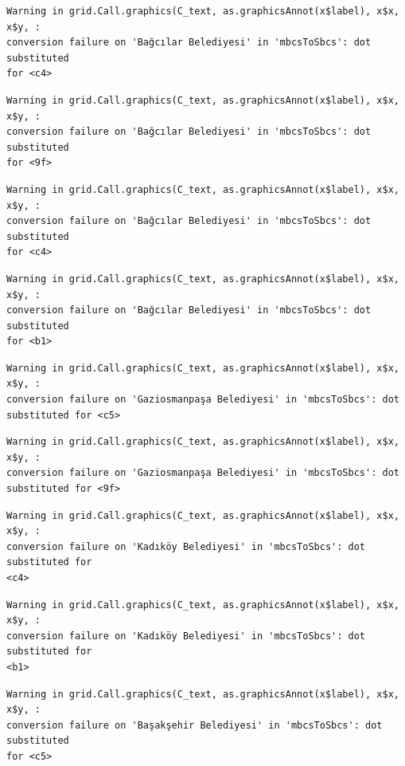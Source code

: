 \documentclass[
  11pt,
  a4paper,
  DIV=11,
  numbers=noendperiod]{scrartcl}
\begin{document}
\begin{verbatim}
Warning in grid.Call.graphics(C_text, as.graphicsAnnot(x$label), x$x, x$y, :
conversion failure on 'Bağcılar Belediyesi' in 'mbcsToSbcs': dot substituted
for <c4>
\end{verbatim}

\begin{verbatim}
Warning in grid.Call.graphics(C_text, as.graphicsAnnot(x$label), x$x, x$y, :
conversion failure on 'Bağcılar Belediyesi' in 'mbcsToSbcs': dot substituted
for <9f>
\end{verbatim}

\begin{verbatim}
Warning in grid.Call.graphics(C_text, as.graphicsAnnot(x$label), x$x, x$y, :
conversion failure on 'Bağcılar Belediyesi' in 'mbcsToSbcs': dot substituted
for <c4>
\end{verbatim}

\begin{verbatim}
Warning in grid.Call.graphics(C_text, as.graphicsAnnot(x$label), x$x, x$y, :
conversion failure on 'Bağcılar Belediyesi' in 'mbcsToSbcs': dot substituted
for <b1>
\end{verbatim}

\begin{verbatim}
Warning in grid.Call.graphics(C_text, as.graphicsAnnot(x$label), x$x, x$y, :
conversion failure on 'Gaziosmanpaşa Belediyesi' in 'mbcsToSbcs': dot
substituted for <c5>
\end{verbatim}

\begin{verbatim}
Warning in grid.Call.graphics(C_text, as.graphicsAnnot(x$label), x$x, x$y, :
conversion failure on 'Gaziosmanpaşa Belediyesi' in 'mbcsToSbcs': dot
substituted for <9f>
\end{verbatim}

\begin{verbatim}
Warning in grid.Call.graphics(C_text, as.graphicsAnnot(x$label), x$x, x$y, :
conversion failure on 'Kadıköy Belediyesi' in 'mbcsToSbcs': dot substituted for
<c4>
\end{verbatim}

\begin{verbatim}
Warning in grid.Call.graphics(C_text, as.graphicsAnnot(x$label), x$x, x$y, :
conversion failure on 'Kadıköy Belediyesi' in 'mbcsToSbcs': dot substituted for
<b1>
\end{verbatim}

\begin{verbatim}
Warning in grid.Call.graphics(C_text, as.graphicsAnnot(x$label), x$x, x$y, :
conversion failure on 'Başakşehir Belediyesi' in 'mbcsToSbcs': dot substituted
for <c5>
\end{verbatim}
\end{document}
